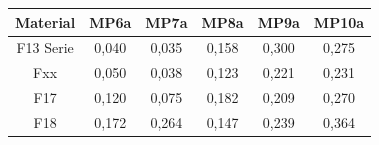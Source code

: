 \documentclass[12pt,a4paper,parskip]{scrartcl}
\begin{document}
\begin{table}[hbtp]
\begin{tabular}{cccccc}
     \bottomrule
    
  Material    & MP6a & MP7a & MP8a & MP9a & MP10a  \\
  \midrule
    F13 Serie &0,040&0,035&0,158&0,300&0,275\\
 Fxx   &0,050&0,038&0,123&0,221&0,231\\
F17 &0,120&0,075&0,182&0,209&0,270\\ 
F18 &0,172&0,264&0,147&0,239&0,364\\
   \bottomrule 
         
   \end{tabular} 
\end{table}
\end{document}
